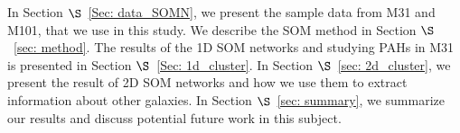 In Section $\S$~\ref{Sec: data_SOMN}, we present the sample data from M31 and M101, that we use in this study. 
We describe the SOM method in Section $\S$~\ref{sec: method}. 
The results of the 1D SOM networks and studying PAHs in M31 is presented in Section $\S$~\ref{Sec: 1d_cluster}.
In Section $\S$~\ref{sec: 2d_cluster}, we present the result of 2D SOM networks and how we use them to extract information about other galaxies.
In Section $\S$~\ref{sec: summary}, we summarize our results and discuss potential future work in this subject.

















